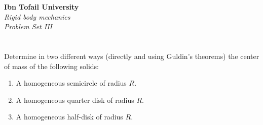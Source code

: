 \documentclass[12pt]{article}
\begin{document}
\begin{center}
\Large\textbf{Ibn Tofail University} \\[1em]
\large\textit{Rigid body mechanics} \\[2em]
\large\textit{Problem Set III} \\[0.5em]
\end{center}

\vspace{1cm}
\section{}

Determine in two different ways (directly and using Guldin's theorems) the center of mass of the following solids:

\begin{enumerate}
    \item A homogeneous semicircle of radius $R$.
    \item A homogeneous quarter disk of radius $R$.
    \item A homogeneous half-disk of radius $R$.
\end{enumerate}
\end{document}
